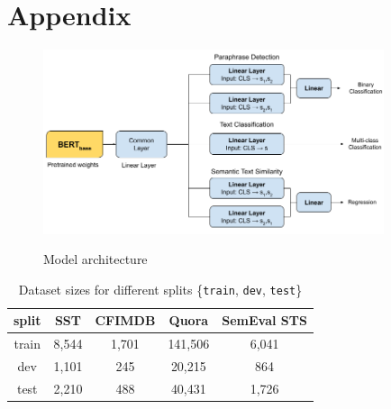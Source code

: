 \documentclass{article}
\begin{document}
    


        
        

\newpage

\section*{Appendix}

\begin{figure}[htp]
\centering
\includegraphics[width=10cm,keepaspectratio]{milestone/model.png}
    \label{fig:ModelArchitecture}
    \caption{Model architecture}
\end{figure}

\begin{table}[htp]
\centering
\begin{tabular}{ |c|c|c|c|c| } 
 \hline
 \textbf{split} & \textbf{SST} & \textbf{CFIMDB} & \textbf{Quora} & \textbf{SemEval STS} \\
 \hline
 train & 8,544 & 1,701 & 141,506 & 6,041 \\
 \hline
 dev & 1,101 & 245 & 20,215 & 864 \\
 \hline
 test & 2,210 & 488 & 40,431 & 1,726\\  
 \hline
\end{tabular}
\caption{Dataset sizes for different splits \{\texttt{train}, \texttt{dev}, \texttt{test}\}}
\label{dataset-sizes}
\end{table}
\end{document}
